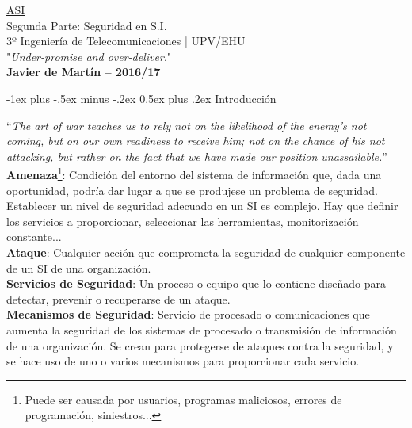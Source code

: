 \documentclass[10pt,portrait, twocolumn]{article}
\makeatletter
\renewcommand{\section}{\@startsection{section}{1}{0mm}%
                                {-1ex plus -.5ex minus -.2ex}%
                                {0.5ex plus .2ex}%
                                {\normalfont\large\bfseries}}
\makeatother
\begin{document}
\begin{framed}
	\begin{center}
    	\Large{\underline{ASI}} \\
	\large{Segunda Parte: Seguridad en S.I.} \\
    	\scriptsize{3º Ingeniería de Telecomunicaciones | UPV/EHU}\\
     	"\textsl{Under-promise and over-deliver}." \\
     	\small{\textbf{Javier de Martín -- 2016/17}}
	\end{center}
\end{framed}

\section{Introducción}

``\textit{The art of war teaches us to rely not on the likelihood of the enemy's not coming, but on our own readiness to receive him; not on the chance of his not attacking, but rather on the fact that we have made our position unassailable.}''\\

\textbf{Amenaza}\footnote{Puede ser causada por usuarios, programas maliciosos, errores de programación, siniestros...}: Condición del entorno del sistema de información que, dada una oportunidad, podría dar lugar a que se produjese un problema de seguridad.\\

Establecer un nivel de seguridad adecuado en un SI es complejo. Hay que definir los servicios a proporcionar, seleccionar las herramientas, monitorización constante...\\

\textbf{Ataque}: Cualquier acción que comprometa la seguridad de cualquier componente de un SI de una organización.\\

\textbf{Servicios de Seguridad}: Un proceso o equipo que lo contiene diseñado para detectar, prevenir o recuperarse de un ataque.\\

\textbf{Mecanismos de Seguridad}: Servicio de procesado o comunicaciones que aumenta la seguridad de los sistemas de procesado o transmisión de información de una organización. Se crean para protegerse de ataques contra la seguridad, y se hace uso de uno o varios mecanismos para proporcionar cada servicio.\\
\end{document}
